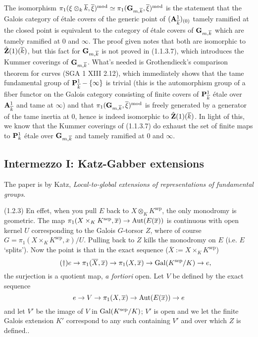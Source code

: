 \documentclass[deligne.tex]{subfiles}
\begin{document}
The isomorphism
$\pi_1(\xi\otimes_k\overline k,\overline\xi)^{\mathrm{mod}}\simeq\pi_1(\mathbf{G}_{m,\overline k},\overline\xi)^{\mathrm{mod}}$
is the statement that the Galois category of étale covers of the generic
point of $(\mathbf{A}^1_{\overline k})_{(0)}$ tamely ramified at the closed point 
is equivalent to the category of étale covers of $\mathbf{G}_{m,\overline k}$
which are tamely ramified at 0 and $\infty$.
The proof given notes that both are isomorphic to $\hat{\mathbf{Z}}(1)(\overline k)$,
but this fact for $\mathbf{G}_{m,\overline k}$ is not proved in (1.1.3.7), which 
introduces the Kummer coverings of $\mathbf{G}_{m,\overline k}$.
What's needed is Grothendieck's
comparison theorem for curves (SGA 1 XIII 2.12), which immediately shows
that the tame fundamental group of $\mathbf{P}^1_{\overline k}-\{\infty\}$ is
trivial (this is the automorphism group of a fiber functor on the Galois
category consisting of finite covers of $\mathbf{P}^1_{\overline k}$ étale over
$\mathbf{A}^1_{\overline k}$ and tame at $\infty$)
and that $\pi_1(\mathbf{G}_{m,\overline k},\overline\xi)^{\mathrm{mod}}$
is freely generated by a generator of the tame inertia at 0, hence is
indeed isomorphic to $\hat{\mathbf{Z}}(1)(\overline k)$.
In light of this, we know that the Kummer coverings of (1.1.3.7) do exhaust
the set of finite maps to $\mathbf{P}^1_k$ étale over $\mathbf{G}_{m,\overline k}$ and
tamely ramified at 0 and $\infty$.

\subsection*{Intermezzo I: Katz-Gabber extensions}
The paper is by Katz,
\emph{Local-to-global extensions of representations of fundamental groups}.

(1.2.3) En effet, when you pull $E$ back to $X\otimes_K K^{\mathrm{sep}}$,
the only monodromy is geometric. The map
$\pi_1(X\times_K K^{\mathrm{sep}},\overline x)\rightarrow\operatorname{Aut}(E(\overline x))$
is continuous with open kernel $U$ corresponding to the Galois $G$-torsor
$Z$, where of course $G=\pi_1(X\times_KK^{\mathrm{sep}},\overline x)/U$.
Pulling back to $Z$ kills the monodromy on $E$ (i.e. $E$ `splits').
Now the point is that in the exact sequence
($\overline X:=X\times_K K^{\mathrm{sep}}$)
\begin{equation*}\tag{$\dagger$}
	e\rightarrow\pi_1(\overline X,\overline x)\rightarrow\pi_1(X,\overline x)\rightarrow\operatorname{Gal}(K^{\mathrm{sep}}/K)\rightarrow e,
\end{equation*}
the surjection is a quotient map, \emph{a fortiori} open. Let $V$ be 
defined by the exact sequence
\begin{equation*}
	e\rightarrow V\rightarrow\pi_1(X,\overline x)\rightarrow\operatorname{Aut}(E(\overline x))\rightarrow e
\end{equation*}
and let $V'$ be the image of $V$ in $\operatorname{Gal}(K^{\mathrm{sep}}/K)$; $V'$
is open and we let the finite Galois extension $K'$ correspond to any such
containing $V'$ and over which $Z$ is defined..
\end{document}
